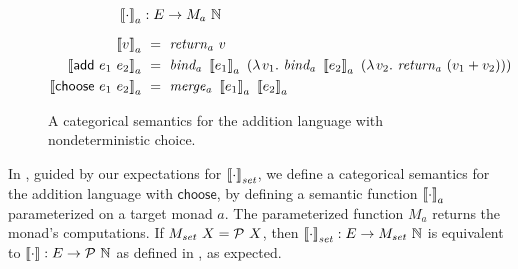 \begin{figure}[tb]\centering
\begin{varwidth}[b]{\textwidth}
\begin{equation*}
\begin{aligned}
	\meaningof{\cdot}_a &: E \to M_a~\Nat
\\[6pt]
	\meaningof{v}_a&\ =\ \mathit{return_a}~v
\\
	\meaningof{\mathsf{add}~e_1~e_2}_a&\ =\ \mathit{bind_a}~\meaningof{e_1}_a~(\fun{v_1} \mathit{bind_a}~\meaningof{e_2}_a~(\fun{v_2} \mathit{return_a}~(v_1 + v_2)))
\\
	\meaningof{\mathsf{choose}~e_1~e_2}_a&\ =\ \mathit{merge_a}~\meaningof{e_1}_a~\meaningof{e_2}_a
\end{aligned}
\end{equation*}
\end{varwidth}
\bottomhrule
\caption[Categorical semantics with nondeterminism]{A categorical semantics for the addition language with nondeterministic choice.}
\label{fig:add-choose-categorical}
\end{figure}

In , guided by our expectations for $\left\llbracket{\cdot}\right\rrbracket_\mathit{set}$, we define a categorical semantics for the addition language with $\mathsf{choose}$, by defining a semantic function $\left\llbracket{\cdot}\right\rrbracket_a$ parameterized on a target monad $a$.
The parameterized function $M_a$ returns the monad's computations.
If $M_\mathit{set}~X = \mathcal{P}~X$, then $\left\llbracket{\cdot}\right\rrbracket_\mathit{set} : E \to M_\mathit{set}~\mathbb{N}$ is equivalent to $\left\llbracket{\cdot}\right\rrbracket : E \to \mathcal{P}~\mathbb{N}$ as defined in , as expected.

